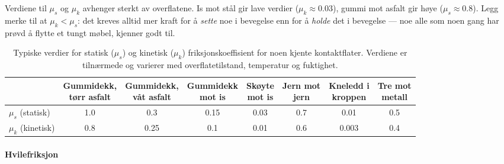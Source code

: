 Verdiene til $\mu_s$ og $\mu_k$ avhenger sterkt av overflatene. Is mot stål gir lave verdier ($\mu_k \approx 0.03$), gummi mot asfalt gir høye ($\mu_s \approx 0.8$). Legg merke til at $\mu_k < \mu_s$: det kreves alltid mer kraft for å \textit{sette} noe i bevegelse enn for å \textit{holde} det i bevegelse — noe alle som noen gang har prøvd å flytte et tungt møbel, kjenner godt til.

\begin{table}[H]
    \centering
    \footnotesize
    \begin{tabular}{|l|c|c|c|c|c|c|c|}
        \hline
        & \shortstack{Gummidekk,\\tørr asfalt} & \shortstack{Gummidekk,\\våt asfalt} & \shortstack{Gummidekk\\mot is} & \shortstack{Skøyte\\mot is} & \shortstack{Jern mot\\jern} & \shortstack{Kneledd i\\kroppen} & \shortstack{Tre mot\\metall} \\
        \hline
        $\mu_s$ (statisk) & 1.0 & 0.3 & 0.15 & 0.03 & 0.7 & 0.01 & 0.5 \\
        \hline
        $\mu_k$ (kinetisk) & 0.8 & 0.25 & 0.1 & 0.01 & 0.6 & 0.003 & 0.4 \\
        \hline
    \end{tabular}
    \caption{Typiske verdier for statisk ($\mu_s$) og kinetisk ($\mu_k$) friksjonskoeffisient for noen kjente kontaktflater. Verdiene er tilnærmede og varierer med overflatetilstand, temperatur og fuktighet.}
    \label{tab:friksjonskoeffisienter}
\end{table}


\paragraph*{Hvilefriksjon}



